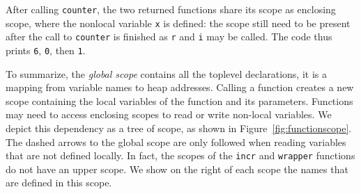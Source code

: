 \documentclass[submission,copyright,creativecommons]{eptcs}
\begin{document}
After calling \texttt{counter}, the two returned functions share its scope as
enclosing scope, where the nonlocal variable \texttt{x} is defined: the scope
still need to be present after the call to \texttt{counter} is finished as
\texttt{r} and \texttt{i} may be called. The
code thus prints \texttt{6}, \texttt{0}, then \texttt{1}.



To summarize, the \emph{global scope} contains all the toplevel declarations, it is a mapping from variable names to heap addresses.
Calling a function creates a new scope containing the local variables of the function and its parameters.
Functions may need to access enclosing scopes to read or write non-local variables.
We depict this dependency as a tree of scope, as shown in Figure~\ref{fig:functionscope}.
The dashed arrows to the global scope are only followed when reading variables
that are not defined locally.
In fact, the scopes of the \texttt{incr} and \texttt{wrapper} functions do not
have an upper scope. We show on the right of each scope the names that are
defined in this scope.
\end{document}
